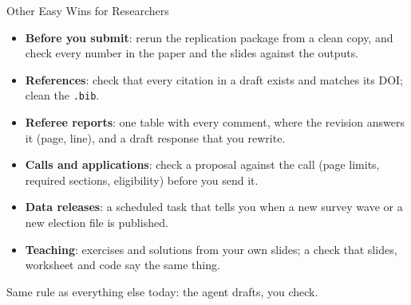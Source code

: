 \documentclass[svgnames,x11names,dvipsnames]{beamer}
\newcommand{\chg}[1]{{\bfseries #1}}
\renewcommand{\chg}[1]{#1}
\begin{document}
\begin{frame}{\chg{Other Easy Wins for Researchers}}

\begin{itemize}
    \setlength{\itemsep}{6pt}
    \item \chg{\textbf{Before you submit}: rerun the replication package from a clean copy, and check every number in the paper and the slides against the outputs.}
    \item \chg{\textbf{References}: check that every citation in a draft exists and matches its DOI; clean the \texttt{.bib}.}
    \item \chg{\textbf{Referee reports}: one table with every comment, where the revision answers it (page, line), and a draft response that you rewrite.}
    \item \chg{\textbf{Calls and applications}: check a proposal against the call (page limits, required sections, eligibility) before you send it.}
    \item \chg{\textbf{Data releases}: a scheduled task that tells you when a new survey wave or a new election file is published.}
    \item \chg{\textbf{Teaching}: exercises and solutions from your own slides; a check that slides, worksheet and code say the same thing.}
\end{itemize}

\vspace{0.3cm}

\centering
\chg{Same rule as everything else today: the agent drafts, you check.}

\end{frame}
\end{document}
